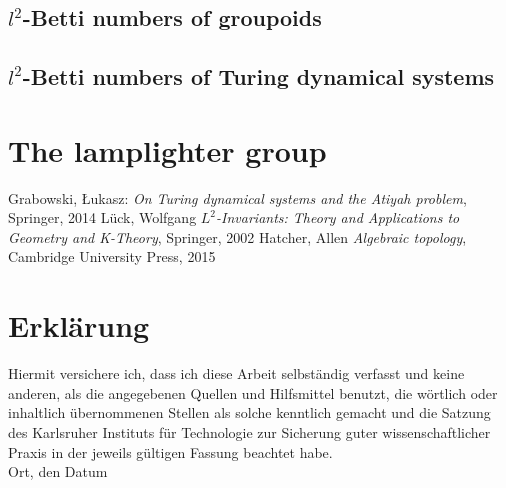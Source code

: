 \documentclass[12pt,a4paper]{scrartcl}
\numberwithin{equation}{section}
\newcommand{\2}{\mathbb{Z} / 2 \mathbb{Z}}
\begin{document}
\subsection{$l^2$-Betti numbers of groupoids}
\subsection{$l^2$-Betti numbers of Turing dynamical systems}
\section{The lamplighter group}
  \newpage

\begin{thebibliography}{Lam00}
  Grabowski, \L ukasz: \emph{On Turing dynamical systems and the Atiyah problem}, Springer, 2014
  Lück, Wolfgang $L^2$\emph{-Invariants: Theory and Applications to Geometry and K-Theory}, Springer, 2002
  Hatcher, Allen \emph{Algebraic topology}, Cambridge University Press, 2015
\end{thebibliography}
 
      

\newpage
  
 \thispagestyle{empty}


\vspace*{8cm}


\section*{Erklärung}

Hiermit versichere ich, dass ich diese Arbeit selbständig verfasst und keine anderen, als die angegebenen Quellen und Hilfsmittel benutzt, die wörtlich oder inhaltlich übernommenen Stellen als solche kenntlich gemacht und die Satzung des Karlsruher Instituts für Technologie zur Sicherung guter wissenschaftlicher Praxis in der jeweils gültigen Fassung beachtet habe. \\[2ex] 

\noindent
Ort, den Datum\\[5ex]

\end{document}

